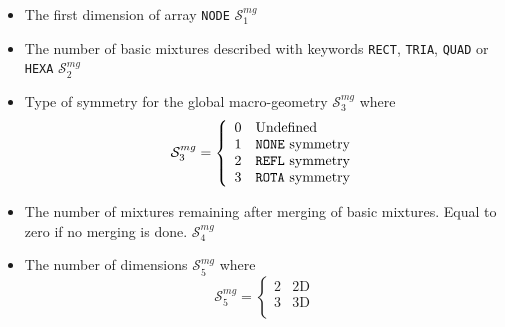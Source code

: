 \begin{itemize}

\item The first dimension of array {\tt NODE} $\mathcal{S}^{mg}_{1}$ 

\item The number of basic mixtures described with keywords {\tt RECT}, {\tt TRIA}, {\tt QUAD} or {\tt HEXA} $\mathcal{S}^{mg}_{2}$ 

\item Type of symmetry for the global macro-geometry $\mathcal{S}^{mg}_{3}$ 
\noindent where
\begin{displaymath}
\mathcal{S}^{mg}_{3} = \left\{
\begin{array}{rl}
 0 & \textrm{Undefined} \\
 1 & \textrm{{\tt NONE} symmetry} \\
 2 & \textrm{{\tt REFL} symmetry} \\
 3 & \textrm{{\tt ROTA} symmetry} \\
\end{array} \right.
\end{displaymath}

\item The number of mixtures remaining after merging of basic mixtures. Equal to zero if no merging is done. $\mathcal{S}^{mg}_{4}$ 
\item The number of dimensions $\mathcal{S}^{mg}_{5}$ 
\noindent where
\begin{displaymath}
\mathcal{S}^{mg}_{5} = \left\{
\begin{array}{rl}
 2 & \textrm{2D} \\
 3 & \textrm{3D} \\
\end{array} \right.
\end{displaymath}
\end{itemize}

\clearpage
